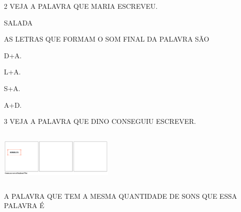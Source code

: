 



\num{2} VEJA A PALAVRA QUE MARIA ESCREVEU.

\begin{mdframed}[linewidth=2pt,linecolor=azul!20,backgroundcolor=azul!20,roundcorner=2pt]
SALADA
\end{mdframed}

AS LETRAS QUE FORMAM O SOM FINAL DA PALAVRA SÃO

\begin{escolha}
\item D+A.

\item L+A.

\item S+A.

\item A+D.
\end{escolha}

\num{3} VEJA A PALAVRA QUE DINO CONSEGUIU ESCREVER.

\includegraphics[width=2.21250in,height=1.04375in]{media/image243.png}


A PALAVRA QUE TEM A MESMA QUANTIDADE DE SONS QUE ESSA PALAVRA É 

